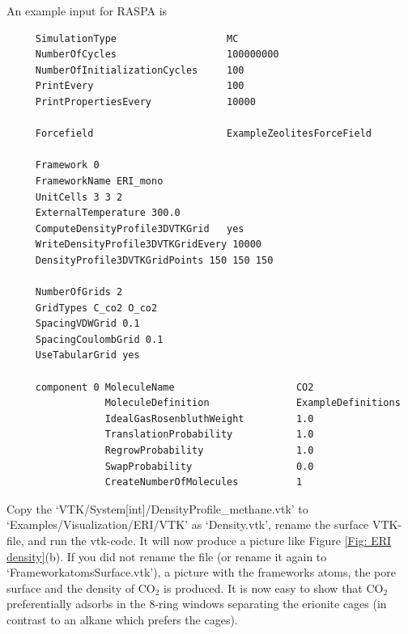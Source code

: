 An example input for RASPA is
\begin{verbatim}
     SimulationType                   MC
     NumberOfCycles                   100000000
     NumberOfInitializationCycles     100
     PrintEvery                       100
     PrintPropertiesEvery             10000

     Forcefield                       ExampleZeolitesForceField

     Framework 0
     FrameworkName ERI_mono
     UnitCells 3 3 2
     ExternalTemperature 300.0
     ComputeDensityProfile3DVTKGrid   yes
     WriteDensityProfile3DVTKGridEvery 10000
     DensityProfile3DVTKGridPoints 150 150 150

     NumberOfGrids 2
     GridTypes C_co2 O_co2
     SpacingVDWGrid 0.1
     SpacingCoulombGrid 0.1
     UseTabularGrid yes

     component 0 MoleculeName                     CO2
                 MoleculeDefinition               ExampleDefinitions
                 IdealGasRosenbluthWeight         1.0
                 TranslationProbability           1.0
                 RegrowProbability                1.0
                 SwapProbability                  0.0
                 CreateNumberOfMolecules          1
\end{verbatim}

Copy the `VTK/System[int]/DensityProfile\_methane.vtk' to `Examples/Visualization/ERI/VTK' as `Density.vtk',
rename the surface VTK-file,
and run the vtk-code. It will now produce a picture like Figure \ref{Fig: ERI density}(b).
If you did not rename the file (or rename it again to `FrameworkatomsSurface.vtk'), a picture with the frameworks atoms,
the pore surface and the density of CO$_2$ is produced. It is now easy to show that CO$_2$ preferentially adsorbs
in the 8-ring windows separating the erionite cages (in contrast to an alkane which prefers the cages).

